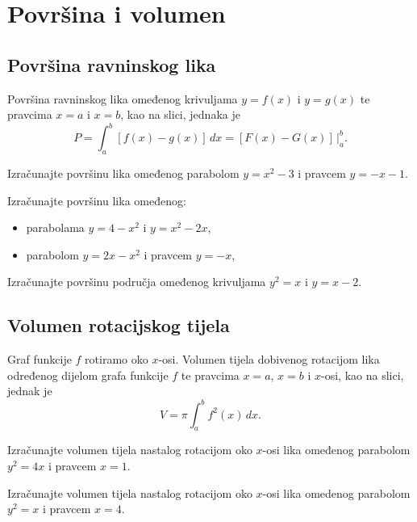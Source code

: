 \section{Površina i volumen}

\subsection{Površina ravninskog lika}

Površina ravninskog lika omeđenog krivuljama $y=f(x)$ i $y=g(x)$ te pravcima
$x=a$ i $x=b$, kao na slici, jednaka je
$$
    P=\int_a^b [f(x) - g(x)]\,dx = [F(x) - G(x)]\,\Big|_a^b.
$$

\begin{example}
    Izračunajte površinu lika omeđenog parabolom $y=x^2-3$ i pravcem $y=-x-1$.
\end{example}

\begin{example}
    Izračunajte površinu lika omeđenog:
    \begin{itemize}
        \item parabolama $y=4-x^2$ i $y=x^2-2x$,
        \item parabolom $y=2x-x^2$ i pravcem $y=-x$,
    \end{itemize}
\end{example}


\begin{example}
    Izračunajte površinu područja omeđenog krivuljama $y^2=x$ i $y=x-2$.
\end{example}

\subsection{Volumen rotacijskog tijela}

Graf funkcije $f$ rotiramo oko $x$-osi. Volumen tijela dobivenog rotacijom lika
određenog dijelom grafa funkcije $f$ te pravcima $x=a$, $x=b$ i $x$-osi, kao na
slici, jednak je
$$
    V=\pi \int_a^b f^2(x)\,dx.
$$

\begin{example}
    Izračunajte volumen tijela nastalog rotacijom oko $x$-osi lika omeđenog
    parabolom $y^2=4x$ i pravcem $x=1$.
\end{example}

\begin{example}
    Izračunajte volumen tijela nastalog rotacijom oko $x$-osi lika omedenog
    parabolom $y^2 = x$ i pravcem $x=4$.
\end{example}

